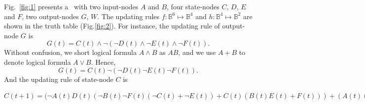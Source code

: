 \begin{example}
Fig.~\ref{fig:1} presents a \BCN\ with two input-nodes $A$ and $B$, four state-nodes $C$, $D$, $E$ and $F$, two output-nodes $G$, $W$. 
%
The updating rules $f:\mathbb{B}^{6}\mapsto \mathbb{B}^4$ and $h:\mathbb{B}^4\mapsto \mathbb{B}^2$ are shown in the truth table (Fig.\ref{fig:2}).  
For instance, the updating rule of output-node $G$ is 
\[G(t)=C(t)\wedge \neg {(\neg {D}(t)\wedge \neg{ E}(t)\wedge \neg{F}(t))}.\]
Without confusion, we short  logical formula $A\wedge B$ as $AB$, and we use $A+B$ to denote logical formula $A\vee B$.  Hence, 
\[G(t)=C(t) \neg {(\neg {D}(t) \neg{ E}(t) \neg{F}(t))}.\]
And the updating rule of state-node $C$ is 

$C(t+1)=(\neg{A}(t)D(t) (\neg{B}(t) \neg{F}(t) (\neg{C}(t) + \neg{E}(t)) + 
C(t)(B(t)E(t)+F(t)))+(A(t)(\neg{D}(t)(\neg{B}(t)\neg{C}(t)+\neg{E}(t)F(t)+
\neg{C}(t)F(t))+B(t)E(t)\neg{F}(t)))+(\neg{B}(t)E(t)(C(t)\neg{D}(t)\neg{F}(t)+
D(t)F(t)))(B(t)\neg{E}(t)(\neg{C}(t)F(t)+C(t)\neg{D}(t))).$


\end{example}
